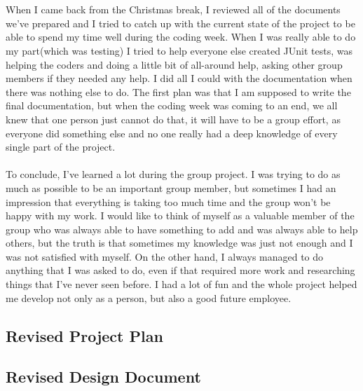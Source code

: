 \documentclass[12pt]{article}
\begin{document}
~\\\\
When I came back from the Christmas break, I reviewed all of the documents we've prepared and I tried to catch up with the current state of the project to be able to spend my time well during the coding week. When I was really able to do my part(which was testing) I tried to help everyone else created JUnit tests, was helping the coders and doing a little bit of all-around help, asking other group members if they needed any help. I did all I could with the documentation when there was nothing else to do. The first plan was that I am supposed to write the final documentation, but when the coding week was coming to an end, we all knew that one person just cannot do that, it will have to be a group effort, as everyone did something else and no one really had a deep knowledge of every single part of the project.
~\\\\
To conclude, I've learned a lot during the group project. I was trying to do as much as possible to be an important group member, but sometimes I had an impression that everything is taking too much time and the group won't be happy with my work. I would like to think of myself as a valuable member of the group who was always able to have something to add and was always able to help others, but the truth is that sometimes my knowledge was just not enough and I was not satisfied with myself. On the other hand, I always managed to do anything that I was asked to do, even if that required more work and researching things that I've never seen before. I had a lot of fun and the whole project helped me develop not only as a person, but also a good future employee.
\newpage

\subsection{Revised Project Plan}


\restoregeometry


\subsection{Revised Design Document}


\restoregeometry

\end{document}
